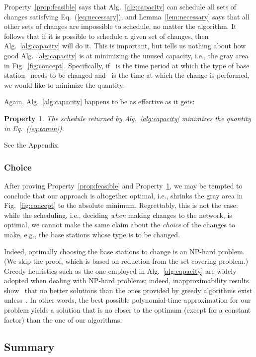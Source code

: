 \documentclass[10pt,journal,cspaper,compsoc]{IEEEtran}
\newcommand{\Fig}[1]{Fig.~\ref{fig:#1}}
\newcommand{\Eq}[1]{Eq.~(\ref{eq:#1})}
\newcommand{\Alg}[1]{Alg.~\ref{alg:#1}}
\newcommand{\Lemma}[1]{Lemma~\ref{lem:#1}}
\newtheorem{property}{Property}
\newcommand{\Prop}[1]{Property~\ref{prop:#1}}
\begin{document}
\Prop{feasible} says that \Alg{capacity} can schedule all sets of changes satisfying \Eq{necessary}, and \Lemma{necessary}
says that all other sets of changes are impossible to schedule, no matter the algorithm.
It follows that if it is possible to schedule a given set
of changes, then \Alg{capacity} will do it. This is important, but tells us nothing about how good \Alg{capacity} is at
minimizing the unused capacity, i.e., the gray area in \Fig{concept}. Specifically, if~ is the time period
at which the type of base station~ needs to be changed and~ is the time at which the change is performed, we would
like to minimize the quantity:


Again, \Alg{capacity} happens to be as effective as it gets:
\begin{property}
\label{prop:optimal}
The schedule returned by \Alg{capacity} minimizes the quantity in \Eq{tomin}.
\end{property}
\begin{IEEEproof}
See the Appendix.
\end{IEEEproof}

\subsubsection{Choice}

After proving \Prop{feasible} and \Prop{optimal}, we may be tempted to conclude that our approach is altogether optimal,
i.e., shrinks the gray area in \Fig{concept} to the absolute minimum. Regrettably, this is not the case: while the scheduling,
i.e., deciding {\em when} making changes to the network, is optimal, we cannot make the same claim about the {\em choice}
of the changes to make, e.g., the base stations
whose type is to be changed.

Indeed, optimally choosing the base stations to change is an NP-hard problem. (We skip the proof, which is based on reduction
from the set-covering problem.) Greedy heuristics such as the one employed in \Alg{capacity} are widely adopted when dealing with
NP-hard problems; indeed, inapproximability results show~\cite{inapprox} that no better solutions than the ones provided by greedy
algorithms exist unless~.
In other words, the best possible polynomial-time approximation for our problem yields a solution that is no closer to the optimum (except for a constant factor) than the one of our algorithms.

\subsection{Summary}
\end{document}
